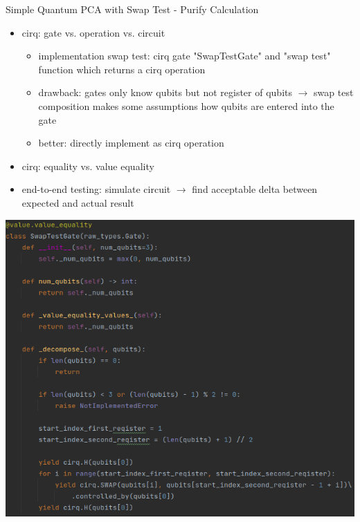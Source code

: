 \begin{frame}{Simple Quantum PCA with Swap Test - Purify Calculation}
  \begin{minipage}{0.5\textwidth}
    \begin{itemize}
      \item cirq: gate vs. operation vs. circuit
      \begin{itemize}
        \item implementation swap test: cirq gate "SwapTestGate" and "swap test" function which returns a cirq operation
        \item drawback: gates only know qubits but not register of qubits $\rightarrow$ swap test composition makes some assumptions how qubits are entered into the gate
        \item better: directly implement as cirq operation
      \end{itemize}
      \item cirq: equality vs. value equality
      \item end-to-end testing: simulate circuit $\rightarrow$ find acceptable delta between expected and actual result
    \end{itemize}
  \end{minipage}%
	\begin{minipage}{0.5\textwidth}
    \centering
    \includegraphics[width=1.0\textwidth]{../assets/code-snippet_swap-gate.png}
  \end{minipage}
\end{frame}


